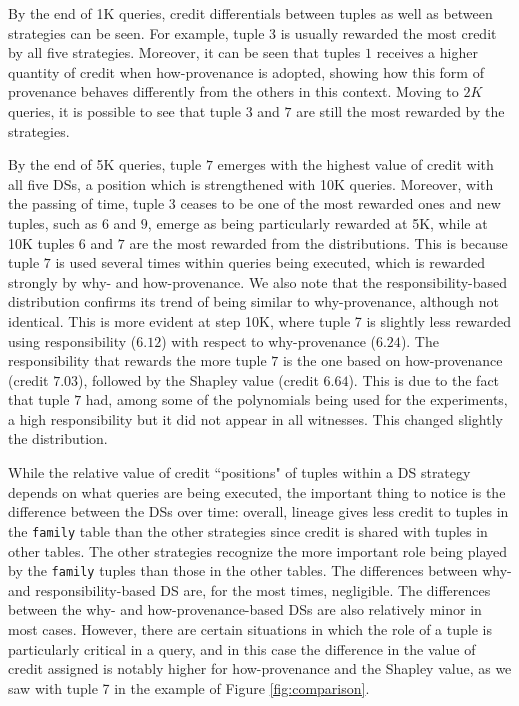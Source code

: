 \documentclass[preprint,12pt,sort&compress]{elsarticle}
\newcommand{\rtwo}[1]{\textcolor{reviewer2}{#1}}
\newcommand{\scream}[1]{{\bf * #1 *}{\typeout{#1}}}
\begin{document}

By the end of 1K queries, credit differentials between tuples as well as between strategies can be seen.  For example, tuple 3 is usually rewarded the most credit by all five strategies. 
\rtwo{Moreover, it can be seen that tuples $1$ receives a higher quantity of credit when how-provenance is adopted, showing how this form of provenance behaves differently from the others in this context}.
Moving to $2K$ queries, it is possible to see that tuple $3$ and $7$ are still the most rewarded by the strategies.

By the end of 5K queries, tuple $7$ emerges with the highest value of credit with all five DSs, a position which is strengthened with 10K queries. Moreover, with the passing of time, tuple $3$ ceases to be one of the most rewarded ones and new tuples, such as $6$ and $9$, emerge as being particularly rewarded at 5K, while at 10K tuples $6$ and $7$ are the most rewarded from the distributions.
This is because tuple $7$ is used several times within queries being executed, which is rewarded strongly by why- and how-provenance.
\rtwo{We also note that the responsibility-based distribution confirms its trend of being similar to why-provenance, although not identical. This is more evident at step 10K, where tuple 7 is slightly less rewarded using responsibility ($6.12$) with respect to why-provenance ($6.24$). 
The responsibility that rewards the more tuple $7$ is the one based on how-provenance (credit $7.03$), followed by the Shapley value (credit $6.64$).
This is due to the fact that tuple $7$ had, among some of the polynomials being used for the experiments, a high responsibility but it did not appear in all witnesses. This changed slightly the distribution.}


While the relative value of credit ``positions" of tuples within a DS strategy depends on what queries are being executed, the important thing to notice is the difference between the DSs over time:  overall, lineage gives less credit to tuples in the \texttt{family} table than the other strategies since credit is shared with tuples in other tables.
The other strategies recognize the more important role being played by the \texttt{family} tuples than those in the other tables.
\rtwo{The differences between why- and responsibility-based DS are, for the most times, negligible.} 
The differences between the why- and how-provenance-based DSs are also relatively minor in most cases. However, there are certain situations in which the role of a tuple is particularly critical in a query, and in this case the difference in the value of credit assigned is notably higher for how-provenance \rtwo{and the Shapley value}, as we saw with tuple 7 in the example of Figure \ref{fig:comparison}. 
\end{document}
